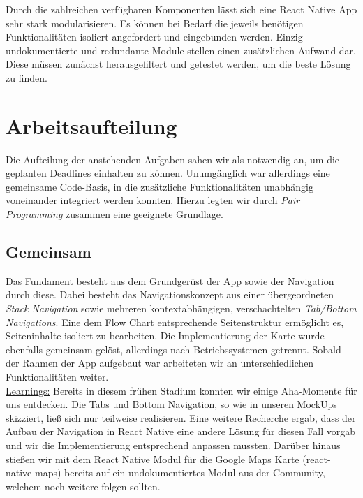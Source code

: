 Durch die zahlreichen verfügbaren Komponenten lässt sich eine React Native App sehr stark modularisieren.
Es können bei Bedarf die jeweils benötigen Funktionalitäten isoliert angefordert und eingebunden werden.
Einzig undokumentierte und redundante Module stellen einen zusätzlichen Aufwand dar.
Diese müssen zunächst herausgefiltert und getestet werden, um die beste Lösung zu finden.



\section{Arbeitsaufteilung}
Die Aufteilung der anstehenden Aufgaben sahen wir als notwendig an, um die geplanten Deadlines einhalten zu können.
Unumgänglich war allerdings eine gemeinsame Code-Basis, in die zusätzliche Funktionalitäten unabhängig voneinander integriert werden konnten.
Hierzu legten wir durch \emph{Pair Programming} zusammen eine geeignete Grundlage.

\subsection{Gemeinsam}
Das Fundament besteht aus dem Grundgerüst der App sowie der Navigation durch diese.
Dabei besteht das Navigationskonzept aus einer übergeordneten \emph{Stack Navigation} sowie mehreren kontextabhängigen, verschachtelten \emph{Tab/Bottom Navigations}.
Eine dem Flow Chart entsprechende Seitenstruktur ermöglicht es, Seiteninhalte isoliert zu bearbeiten.
Die Implementierung der Karte wurde ebenfalls gemeinsam gelöst, allerdings nach Betriebssystemen getrennt.
Sobald der Rahmen der App aufgebaut war arbeiteten wir an unterschiedlichen Funktionalitäten weiter.
\\
\underline{Learnings:}
Bereits in diesem frühen Stadium konnten wir einige Aha-Momente für uns entdecken.
Die Tabs und Bottom Navigation, so wie in unseren MockUps skizziert, ließ sich nur teilweise realisieren.
Eine weitere Recherche ergab, dass der Aufbau der Navigation in React Native eine andere Lösung für diesen Fall vorgab und wir die Implementierung entsprechend anpassen mussten.
Darüber hinaus stießen wir mit dem React Native Modul für die Google Maps Karte (react-native-maps) bereits auf ein undokumentiertes Modul aus der Community, welchem noch weitere folgen sollten.

